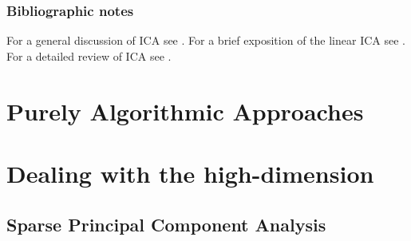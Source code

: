\documentclass[12pt,a4paper]{article}
\begin{document}
\subsubsection{Bibliographic notes}
For a general discussion of ICA see \cite{jolliffe2002principal}.
For a brief exposition of the linear ICA see \cite{friedman2001elements}. 
For a detailed review of ICA see \cite{hyvarinen2000independent}. 








\section{Purely Algorithmic Approaches}







\section{Dealing with the high-dimension}

\subsection{Sparse Principal Component Analysis}
\label{sec:sPCA}




\newpage


\end{document}
